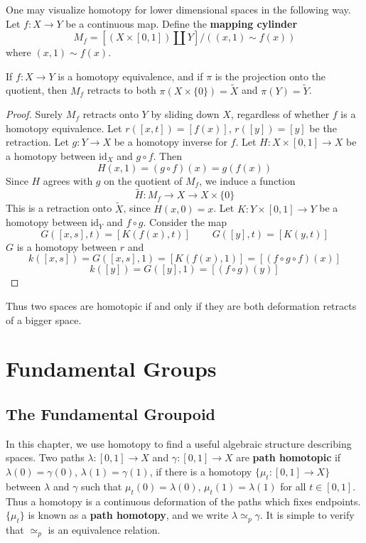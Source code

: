 \newpage

One may visualize homotopy for lower dimensional spaces in the following way. Let $f:X \to Y$ be a continuous map. Define the {\bf mapping cylinder}
%
\[ M_f = \left[(X \times [0,1]) \coprod Y\right] / ((x,1) \sim f(x)) \]
%
where $(x,1) \sim f(x)$.

\begin{lemma}
    If $f: X \to Y$ is a homotopy equivalence, and if $\pi$ is the projection onto the quotient, then $M_f$ retracts to both $\pi(X \times \{0\}) = \tilde{X}$ and $\pi(Y) = \tilde{Y}$.
\end{lemma}
\begin{proof}
    Surely $M_f$ retracts onto $Y$ by sliding down $X$, regardless of whether $f$ is a homotopy equivalence. Let $r([x,t]) = [f(x)]$, $r([y]) = [y]$ be the retraction. Let $g: Y \to X$ be a homotopy inverse for $f$. Let $H: X \times [0,1] \to X$ be a homotopy between $\text{id}_X$ and $g \circ f$. Then
    \[ H(x,1) = (g \circ f)(x) = g(f(x)) \]
    Since $H$ agrees with $g$ on the quotient of $M_f$, we induce a function
    \[ \tilde{H}: M_f \to X \to X \times \{ 0 \} \]
    This is a retraction onto $\tilde{X}$, since $H(x,0) = x$. Let $K: Y \times [0,1] \to Y$ be a homotopy between $\text{id}_Y$ and $f \circ g$. Consider the map
    \[ G([x,s], t) = [K(f(x), t)]\ \ \ \ \ \ \ \ \ \ G([y],t) = [K(y,t)] \]
    $G$ is a homotopy between $r$ and
    \[ k([x,s]) = G([x,s],1) = [K(f(x),1)] = [(f \circ g \circ f)(x)] \]
    \[ k([y]) = G([y],1) = [(f \circ g)(y)] \]
\end{proof}

Thus two spaces are homotopic if and only if they are both deformation retracts of a bigger space.







\chapter{Fundamental Groups}

\section{The Fundamental Groupoid}

In this chapter, we use homotopy to find a useful algebraic structure describing spaces. Two paths $\lambda:[0,1] \to X$ and $\gamma:[0,1] \to X$ are {\bf path homotopic} if $\lambda(0) = \gamma(0)$, $\lambda(1) = \gamma(1)$, if there is a homotopy $\{ \mu_t: [0,1] \to X \}$ between $\lambda$ and $\gamma$ such that $\mu_t(0) = \lambda(0)$, $\mu_t(1) = \lambda(1)$ for all $t \in [0,1]$. Thus a homotopy is a continuous deformation of the paths which fixes endpoints. $\{ \mu_t \}$ is known as a {\bf path homotopy}, and we write $\lambda \simeq_p \gamma$. It is simple to verify that $\simeq_p$ is an equivalence relation.

